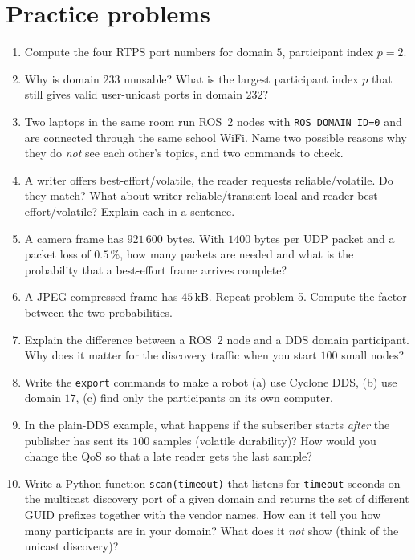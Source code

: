 \section*{Practice problems}
\begin{enumerate}[label=\textbf{\thechapter.\arabic*}]
  \item Compute the four RTPS port numbers for domain $5$, participant index $p=2$.
  \item Why is domain $233$ unusable? What is the largest participant index $p$ that still gives valid user-unicast ports in domain $232$?
  \item Two laptops in the same room run ROS~2 nodes with \verb!ROS_DOMAIN_ID=0! and are connected through the same school WiFi. Name two possible reasons why they do \emph{not} see each other's topics, and two commands to check.
  \item A writer offers best-effort/volatile, the reader requests reliable/volatile. Do they match? What about writer reliable/transient local and reader best effort/volatile? Explain each in a sentence.
  \item A camera frame has $921\,600$ bytes. With $1400$ bytes per UDP packet and a packet loss of $0.5\,\%$, how many packets are needed and what is the probability that a best-effort frame arrives complete?
  \item A JPEG-compressed frame has $45$\,kB. Repeat problem 5. Compute the factor between the two probabilities.
  \item Explain the difference between a ROS~2 node and a DDS domain participant. Why does it matter for the discovery traffic when you start $100$ small nodes?
  \item Write the \verb!export! commands to make a robot (a) use Cyclone DDS, (b) use domain $17$, (c) find only the participants on its own computer.
  \item In the plain-DDS example, what happens if the subscriber starts \emph{after} the publisher has sent its $100$ samples (volatile durability)? How would you change the QoS so that a late reader gets the last sample?
  \item[\textbf{\thechapter.10}$\star$] Write a Python function \verb!scan(timeout)! that listens for \verb!timeout! seconds on the multicast discovery port of a given domain and returns the set of different GUID prefixes together with the vendor names. How can it tell you how many participants are in your domain? What does it \emph{not} show (think of the unicast discovery)?
\end{enumerate}
